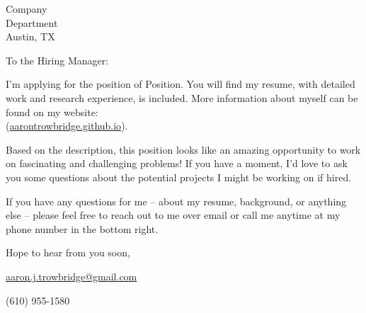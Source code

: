 \documentclass{letter}
\newcommand{\position}   {Position}
\newcommand{\company}    {Company}
\newcommand{\department} {Department}
\newcommand{\city}       {Austin, TX}
\begin{document}
\begin{letter}{\company \\ \department \\ \city}

\opening{To the Hiring Manager:}

I'm applying for the position of \position. You will find my resume, with detailed work and research experience, is included.  More information about myself can be found on my website: \\ (\href{https://aarontrowbridge.github.io/}{aarontrowbridge.github.io}).

Based on the description, this position looks like an amazing opportunity to work on fascinating and challenging problems! If you have a moment, I'd love to ask you some questions about the potential projects I might be working on if hired.

If you have any questions for me -- about my resume, background, or anything else -- please feel free to reach out to me over email or call me anytime at my phone number in the bottom right.  

\closing{Hope to hear from you soon,}

\vfill 

\hfill \href{mailto:aaron.j.trowbridge@gmail.com}{aaron.j.trowbridge@gmail.com} 

\hfill (610) 955-1580

\end{letter}
\end{document}
